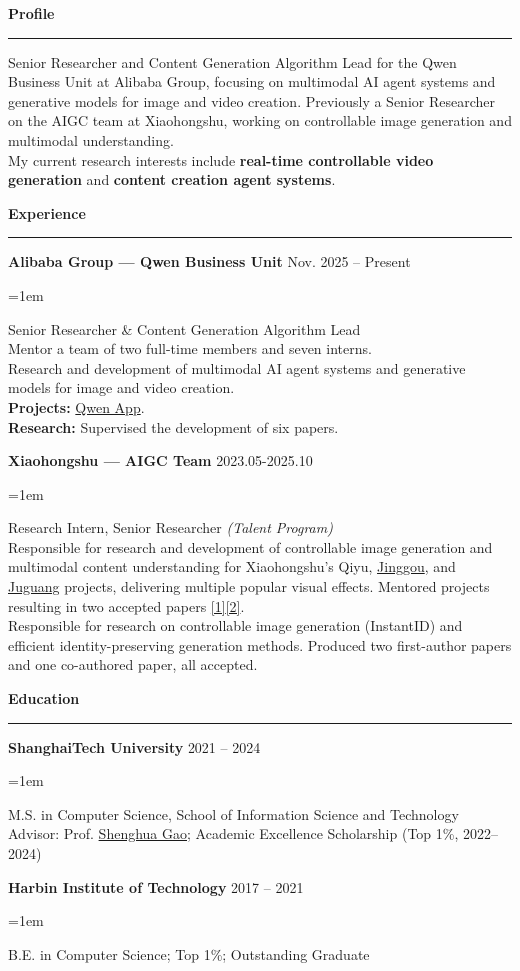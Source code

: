 \documentclass{resume}
\renewenvironment{rSection}[1]{
\sectionskip
\textcolor{DefaultBlack}{\bf #1}
\sectionlineskip
\hrule
\begin{list}{}{
\setlength{\leftmargin}{0em}
}
\item[]
}{
\end{list}
\vspace{-0.25em}
}
\renewenvironment{rSubsection}[2]{
{\bf #1} \hfill {#2}
\begin{list}{}{\leftmargin=1em}
\item[] \vspace{-0.55em}
}{
\end{list}
\vspace{-0.25em}
}
\begin{document}
\begin{rSection}{Profile}
Senior Researcher and Content Generation Algorithm Lead for the Qwen Business Unit at Alibaba Group, focusing on multimodal AI agent systems and generative models for image and video creation. Previously a Senior Researcher on the AIGC team at Xiaohongshu, working on controllable image generation and multimodal understanding.\\
My current research interests include \textbf{real-time controllable video generation} and \textbf{content creation agent systems}.
\end{rSection}

\begin{rSection}{Experience}
\begin{rSubsection}{Alibaba Group --- Qwen Business Unit}{Nov. 2025 -- Present}
Senior Researcher \& Content Generation Algorithm Lead\\
Mentor a team of two full-time members and seven interns.\\
Research and development of multimodal AI agent systems and generative models for image and video creation.\\
\textbf{Projects:} \href{https://www.qianwen.com/}{Qwen App}.\\
\textbf{Research:} Supervised the development of six papers.
\end{rSubsection}

\begin{rSubsection}{Xiaohongshu --- AIGC Team}{2023.05-2025.10}
Research Intern, Senior Researcher \textit{(Talent Program)}\\
Responsible for research and development of controllable image generation and multimodal content understanding for Xiaohongshu's Qiyu, \href{https://www.53ai.com/news/neirongchuangzuo/2024090686590.html}{Jinggou}, and \href{https://ad.xiaohongshu.com/}{Juguang} projects, delivering multiple popular visual effects. Mentored projects resulting in two accepted papers \href{https://dl.acm.org/doi/10.1145/3805622.3810729}{[1]}\href{https://arxiv.org/pdf/2603.29469}{[2]}.\\[0.4em]
Responsible for research on controllable image generation (InstantID) and efficient identity-preserving generation methods. Produced two first-author papers and one co-authored paper, all accepted.
\end{rSubsection}
\end{rSection}

\begin{rSection}{Education}
\begin{rSubsection}{ShanghaiTech University}{2021 -- 2024}
M.S. in Computer Science, School of Information Science and Technology\\
Advisor: Prof. \href{https://scholar.google.com.sg/citations?user=fe-1v0MAAAAJ\&hl=en}{Shenghua Gao}; Academic Excellence Scholarship (Top 1\%, 2022--2024)
\end{rSubsection}

\begin{rSubsection}{Harbin Institute of Technology}{2017 -- 2021}
B.E. in Computer Science; Top 1\%; Outstanding Graduate
\end{rSubsection}
\end{rSection}
\end{document}
